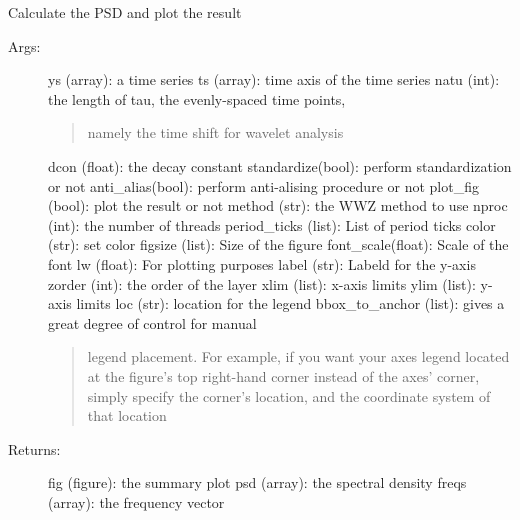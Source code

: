 \documentclass[letterpaper,10pt,english]{sphinxmanual}
\begin{document}
\begin{fulllineitems}
\label{\detokenize{Spectral:pyleoclim.Spectral.calc_plot_psd}}
Calculate the PSD and plot the result
\begin{description}
\item[{Args:}] \leavevmode
ys (array): a time series
ts (array): time axis of the time series
natu (int): the length of tau, the evenly-spaced time points,
\begin{quote}

namely the time shift for wavelet analysis
\end{quote}

dcon (float): the decay constant
standardize(bool): perform standardization or not
anti\_alias(bool): perform anti-alising procedure or not
plot\_fig (bool): plot the result or not
method (str): the WWZ method to use
nproc (int): the number of threads
period\_ticks (list): List of period ticks
color (str): set color
figsize (list): Size of the figure
font\_scale(float): Scale of the font
lw (float): For plotting purposes
label (str): Labeld for the y-axis
zorder (int): the order of the layer
xlim (list): x-axis limits
ylim (list): y-axis limits
loc (str): location for the legend
bbox\_to\_anchor (list): gives a great degree of control for manual
\begin{quote}

legend placement. For example, if you want your axes legend
located at the figure’s top right-hand corner instead of the axes’
corner, simply specify the corner’s location, and the coordinate 
system of that location
\end{quote}

\item[{Returns:}] \leavevmode
fig (figure): the summary plot
psd (array): the spectral density
freqs (array): the frequency vector

\end{description}

\end{fulllineitems}
\end{document}
